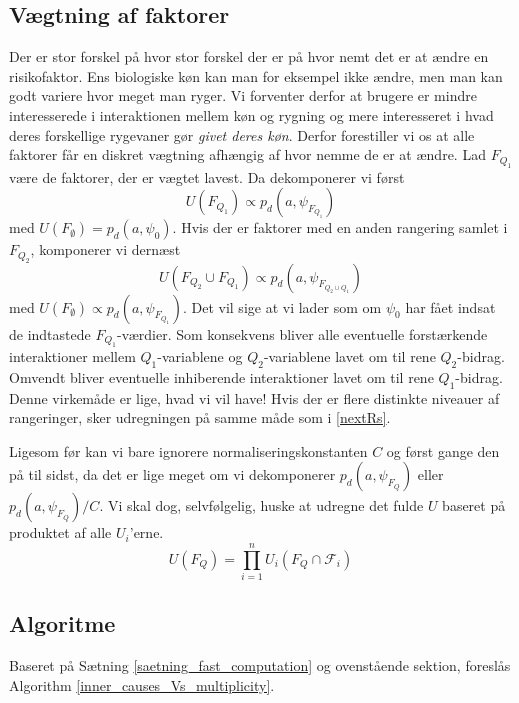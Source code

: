 \documentclass[a4paper, 12pt]{article}
\begin{document}
\subsection{Vægtning af faktorer}\label{rangering}
Der er stor forskel på hvor stor forskel der er på hvor nemt det er at ændre en risikofaktor. Ens biologiske køn kan man for eksempel ikke ændre, men man kan godt variere hvor meget man ryger. Vi forventer derfor at brugere er mindre interesserede i interaktionen mellem køn og rygning og mere interesseret i hvad deres forskellige rygevaner gør \emph{givet deres køn}. Derfor forestiller vi os at alle faktorer får en diskret vægtning afhængig af hvor nemme de er at ændre. Lad $F_{Q_1}$ være de faktorer, der er vægtet lavest. Da dekomponerer vi først
\begin{equation}
 U(F_{Q_1})\propto p_d(a,\psi_{F_{Q_1}})
\end{equation}
med $ U({F_\emptyset})=p_d(a, \psi_0)$. Hvis der er faktorer med en anden rangering samlet i $F_{Q_2}$, komponerer vi dernæst 
\begin{equation}
 U(F_{Q_2}\cup F_{Q_1})\propto p_d(a,\psi_{F_{Q_2\cup Q_1}})\label{nextRs}
\end{equation}
med $U (F_{\emptyset})\propto p_d(a, \psi_{F_{Q_1}})$. Det vil sige at vi lader som om $\psi_0$ har fået indsat de indtastede $F_{Q_1}$-værdier. Som konsekvens bliver alle eventuelle forstærkende interaktioner mellem $Q_1$-variablene og $Q_2$-variablene lavet om til rene $Q_2$-bidrag.  Omvendt bliver eventuelle inhiberende interaktioner lavet om til rene $Q_1$-bidrag. Denne virkemåde er lige, hvad vi vil have! Hvis der er flere distinkte niveauer af rangeringer, sker udregningen på samme måde som i \eqref{nextRs}. 

Ligesom før kan vi bare ignorere normaliseringskonstanten $C$ og først gange den på til sidst, da det er lige meget om vi dekomponerer $p_d(a, \psi_{F_Q})$ eller $p_d(a,\psi_{F_Q})/C$. Vi skal dog, selvfølgelig, huske at udregne det fulde $ U$ baseret på produktet af alle $U_i$'erne.
\begin{equation}
 U(F_Q)=\prod_{i=1}^nU_i(F_Q\cap \mathcal F_i)
\end{equation}

\subsection{Algoritme}
Baseret på Sætning \ref{saetning_fast_computation} og ovenstående sektion, foreslås Algorithm \ref{inner_causes_Vs_multiplicity}. 
\end{document}
